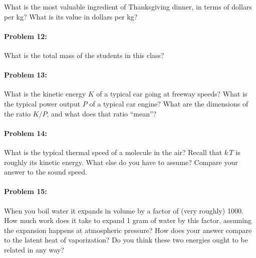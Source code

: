 \documentclass[12pt]{article}
\begin{document}
What is the most valuable ingredient of Thanksgiving dinner, in terms
of dollars per kg?  What is its value in dollars per kg?

\paragraph{Problem 12:}

What is the total mass of the students in this class?

\paragraph{Problem 13:}

What is the kinetic energy $K$ of a typical car going at freeway
speeds?  What is the typical power output $P$ of a typical car engine?
What are the dimensions of the ratio $K/P$, and what does that ratio
``mean''?

\paragraph{Problem 14:}

What is the typical thermal speed of a molecule in the air?  Recall
that $k\,T$ is roughly its kinetic energy.  What else do you have to
assume?  Compare your answer to the sound speed.

\paragraph{Problem 15:}

When you boil water it expands in volume by a factor of (very roughly)
1000.  How much work does it take to expand 1 gram of water by this
factor, assuming the expansion happens at atmospheric pressure?  How
does your answer compare to the latent heat of vaporization?  Do you
think these two energies ought to be related in any way?
\end{document}

